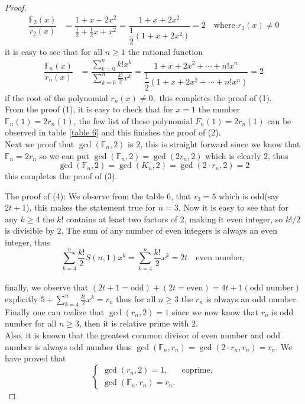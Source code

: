 \documentclass[pdflatex,sn-mathphys-num]{sn-jnl}%
\theoremstyle{thmstyleone}%
\theoremstyle{thmstyletwo}%
\theoremstyle{thmstylethree}%
\begin{document}
\begin{proof}
\begin{align*}
    \dfrac{\mathbb{F}_{2}(x)}{r_2(x)}&=\dfrac{1+x+2x^2}{\frac{1}{2}+ \frac{1}{2}x + x^2}
    =\dfrac{ 1+x+2x^2}{\dfrac{1}{2}\left(1+x+2x^2 \right)}=2 \quad \mbox{where $r_2(x) \neq 0$}
\end{align*}
it is easy to see that for all $n\geq 1$ the rational function
\begin{align*}
    \dfrac{\mathbb{F}_{n}(x)}{r_n(x)}&=\dfrac{\sum_{k=0}^n k! x^k}{\sum_{k=0}^n \frac{k!}{2}x^k}=\dfrac{ 1+x+2x^2+\cdots+n!x^n}{\dfrac{1}{2}\left(1+x+2x^2+\cdots+n!x^n \right)}=2
\end{align*}
if the root of the polynomial $r_n(x) \neq 0,$ this completes the proof of (1).\\

From the proof (1), it is easy to check that for $x=1$ the number $\mathbb{F}_{n}(1)=2r_n(1)$, the few list of these polynomial $F_n(1)=2r_n(1)$ can be observed in table \ref{table 6} and this finishes the proof of (2). \\

Next we proof that $\gcd(\mathbb{F}_n, 2)$ is $2$, this is straight forward since we know that $\mathbb{F}_{n}=2r_n$ so we can put $\gcd(\mathbb{F}_n, 2)=\gcd(2r_n, 2)$ which is clearly $2$, thus
$$\gcd(\mathbb{F}_n, 2)=\gcd(K_n, 2)=\gcd(2\cdotp r_n, 2)=2$$
this completes the proof of ($3$).

The proof of (4): We observe from the table $6$, that $r_3=5$ which is odd(say $2t+1$), this makes the statement true for $n=3.$ Now it is easy to see that for any $k\geq 4$ the $k!$ contains at least two factors of $2$, making it even integer, so $ k!/2$ is divisible by $2$.
The sum of any number of even integers is always an even integer, thus
  \begin{equation*}
\sum_{k=4}^n \frac{k!}{2} S(n,1)x^k=\sum_{k=4}^n \frac{k!}{2}x^k=2t\quad \mbox{even number},
 \end{equation*}\\
  finally, we observe that $(2t+1=\mbox{odd})+ (2t=\mbox{even})=4t +1 (\mbox{odd number})$ \\
  explicitly $ 5+ \sum_{k=4}^n \frac{k!}{2}x^k=r_n$ thus for all $n\geq 3$ the $r_n$ is always an odd number.\\
 Finally one can realize that $\gcd(r_{n},2)=1$ since we now know that $r_n$ is odd number for all $n\geq 3$, then it is relative prime with $2.$\\
 Also, it is known that the greatest common divisor of even number and odd number is always odd
 number thus $\gcd(\mathbb{F}_{n}, r_{n})=\gcd(2\cdotp r_n, r_{n})=r_{n}$. We have proved that
\begin{equation*}
\begin{cases}
	\text{$\gcd(r_{n},2)=1$,}    & \text{coprime},\\
	\text{$\gcd(\mathbb{F}_{n}, r_{n})=r_{n}$}.
\end{cases}
 \end{equation*}
 
\end{proof}
\end{document}
